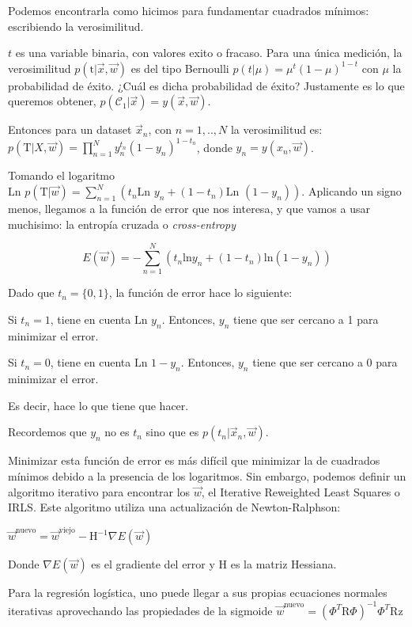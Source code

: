 \documentclass[twoside,11pt]{article}
\begin{document}
Podemos encontrarla como hicimos para fundamentar cuadrados mínimos: escribiendo la verosimilitud.

$t$ es una variable binaria, con valores exito o fracaso. 
Para una única medición, la verosimilitud $p(\text{t}|\vec{x},\vec{w})$ es del tipo Bernoulli $p(t|\mu)=\mu^{t}(1-\mu)^{1-t}$ con $\mu$ la probabilidad de éxito. 
¿Cuál es dicha probabilidad de éxito? Justamente es lo que queremos obtener, $p(\mathcal{C}_{1}|\vec{x})=y(\vec{x},\vec{w})$.

Entonces para un dataset $\vec{x}_{n}$, con $n=1,..,N$ la verosimilitud es:\\
$p(\text{T}|X,\vec{w})=\prod_{n=1}^{N}y^{t_n}_{n}(1-y_{n})^{1-t_n}$, donde $y_{n}=y(x_{n},\vec{w})$. 

Tomando el logaritmo 
$\text{Ln }p(\text{T}|\vec{w})=\sum_{n=1}^{N}(t_{n}\text{Ln }y_{n}+(1-t_{n})\text{Ln }(1-y_{n}))$. 
Aplicando un signo menos, llegamos a la función de error que nos interesa, y que vamos a usar muchisimo: 
la entropía cruzada o \textit{cross-entropy}

$$E(\vec{w})=-\sum_{n=1}^{N}(t_{n}\text{ln}y_{n}+(1-t_{n})\text{ln}(1-y_{n}))$$

Dado que $t_{n}=\{0,1\}$, la función de error hace lo siguiente:

Si $t_{n}=1$, tiene en cuenta $\text{Ln }y_{n}$.
Entonces, $y_{n}$ tiene que ser cercano a 1 para minimizar el error.

Si $t_{n}=0$, tiene en cuenta $\text{Ln }1-y_{n}$. 
Entonces, $y_{n}$ tiene que ser cercano a 0 para minimizar el error.

Es decir, hace lo que tiene que hacer. 

Recordemos que $y_{n}$ no es $t_{n}$ sino que es $p(t_{n}|\vec{x}_{n},\vec{w})$.

Minimizar esta función de error es más difícil que minimizar la de cuadrados mínimos debido a la presencia de los logaritmos. 
Sin embargo, podemos definir un algoritmo iterativo para encontrar los $\vec{w}$, el Iterative Reweighted Least Squares o IRLS. 
Este algoritmo utiliza una actualización de Newton-Ralphson:

$\vec{w}^{\text{nuevo}}=\vec{w}^{\text{viejo}}-\text{H}^{-1}\nabla E(\vec{w})$

Donde $\nabla E(\vec{w})$ es el gradiente del error y $\text{H}$ es la matriz Hessiana.

Para la regresión logística, uno puede llegar a sus propias ecuaciones normales iterativas 
aprovechando las propiedades de la sigmoide
$\vec{w}^{\text{nuevo}}=( \Phi^{T}\text{R}\Phi )^{-1}\Phi^{T}\text{R}\text{z}$
\end{document}

